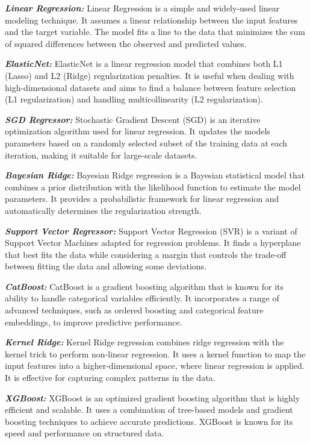 \begin{multicols}{2}
\emph{{\bfseries Linear Regression:}} Linear Regression is a simple and
widely-used linear modeling technique. It assumes a linear relationship
between the input features and the target variable. The model fits a
line to the data that minimizes the sum of squared differences between
the observed and predicted values.

\emph{{\bfseries ElasticNet:}} ElasticNet is a linear regression model that
combines both L1 (Lasso) and L2 (Ridge) regularization penalties. It is
useful when dealing with high-dimensional datasets and aims to find a
balance between feature selection (L1 regularization) and handling
multicollinearity (L2 regularization).

\emph{{\bfseries SGD Regressor:}} Stochastic Gradient Descent (SGD) is an
iterative optimization algorithm used for linear regression. It updates
the model\textquotesingle s parameters based on a randomly selected
subset of the training data at each iteration, making it suitable for
large-scale datasets.

\emph{{\bfseries Bayesian Ridge:}} Bayesian Ridge regression is a Bayesian
statistical model that combines a prior distribution with the likelihood
function to estimate the model parameters. It provides a probabilistic
framework for linear regression and automatically determines the
regularization strength.

\emph{{\bfseries Support Vector Regressor:}} Support Vector Regression
(SVR) is a variant of Support Vector Machines adapted for regression
problems. It finds a hyperplane that best fits the data while
considering a margin that controls the trade-off between fitting the
data and allowing some deviations.

\emph{{\bfseries CatBoost:}} CatBoost is a gradient boosting algorithm that
is known for its ability to handle categorical variables efficiently. It
incorporates a range of advanced techniques, such as ordered boosting
and categorical feature embeddings, to improve predictive performance.

\emph{{\bfseries Kernel Ridge:}} Kernel Ridge regression combines ridge
regression with the kernel trick to perform non-linear regression. It
uses a kernel function to map the input features into a
higher-dimensional space, where linear regression is applied. It is
effective for capturing complex patterns in the data.

\emph{{\bfseries XGBoost:}} XGBoost is an optimized gradient boosting
algorithm that is highly efficient and scalable. It uses a combination
of tree-based models and gradient boosting techniques to achieve
accurate predictions. XGBoost is known for its speed and performance on
structured data.


\end{multicols}
